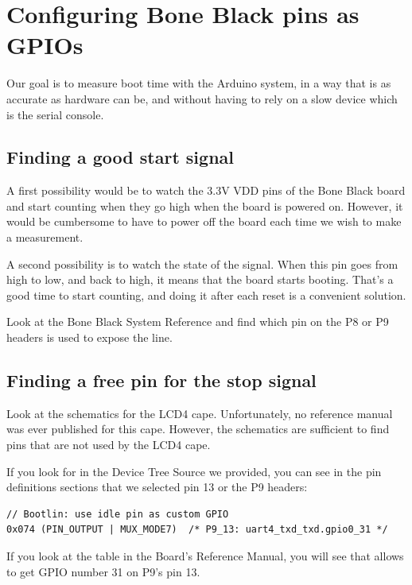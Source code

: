 \section{Configuring Bone Black pins as GPIOs}

Our goal is to measure boot time with the Arduino system, in a way that
is as accurate as hardware can be, and without having to rely on a slow
device which is the serial console.

\subsection{Finding a good start signal}

A first possibility would be to watch the 3.3V VDD pins of the Bone
Black board and start counting when they go high when the board is
powered on. However, it would be cumbersome to have to power off the
board each time we wish to make a measurement.

A second possibility is to watch the state of the  signal.
When this pin goes from high to low, and back to high, it means that the
board starts booting. That's a good time to start counting, and doing
it after each reset is a convenient solution.

Look at the Bone Black System Reference and find which pin on the P8 or
P9 headers is used to expose the  line.

\subsection{Finding a free pin for the stop signal}

Look at the schematics for the LCD4 cape. Unfortunately, no reference
manual was ever published for this cape. However, the schematics are
sufficient to find pins that are not used by the LCD4 cape.

If you look for  in the Device Tree Source we provided,
you can see in the pin definitions sections that we selected pin 13 or
the P9 headers:

\begin{verbatim}
// Bootlin: use idle pin as custom GPIO
0x074 (PIN_OUTPUT | MUX_MODE7)  /* P9_13: uart4_txd_txd.gpio0_31 */
\end{verbatim}

If you look at the  table in the
Board's Reference Manual, you will see that  allows to get
GPIO number 31 on P9's pin 13.

